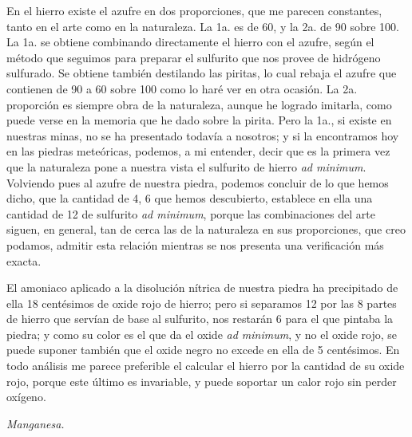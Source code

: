 \documentclass[a4paper, 11pt, oneside, polutonikogreek, spanish]{article}
\begin{document}
En el hierro existe el azufre en dos proporciones, que me parecen constantes, tanto en el arte como en la naturaleza. La 1a. es de 60, y la 2a. de 90 sobre 100. La 1a. se obtiene combinando directamente el hierro con el azufre, según el método que seguimos para preparar el sulfurito que nos provee de hidrógeno sulfurado. Se obtiene también destilando las piritas, lo cual rebaja el azufre que contienen de 90 a 60 sobre 100 como lo haré ver en otra ocasión. La 2a. proporción es siempre obra de la naturaleza, aunque he logrado imitarla, como puede verse en la memoria que he dado sobre la pirita. Pero la 1a., si existe en nuestras minas, no se ha presentado todavía a nosotros; y si la encontramos hoy en las piedras meteóricas, podemos, a mi entender, decir que es la primera vez que la naturaleza pone a nuestra vista el sulfurito de hierro \emph{ad minimum}. Volviendo pues al azufre de nuestra piedra, podemos concluir de lo que hemos dicho, que la cantidad de 4, 6 que hemos descubierto, establece en ella una cantidad de 12 de sulfurito \emph{ad minimum}, porque las combinaciones del arte siguen, en general, tan de cerca las de la naturaleza en sus proporciones, que creo podamos, admitir esta relación mientras se nos presenta una verificación más exacta.

El amoniaco aplicado a la disolución nítrica de nuestra piedra ha precipitado de ella 18 centésimos de oxide rojo de hierro; pero si separamos 12 por las 8 partes de hierro que servían de base al sulfurito, nos restarán 6 para el que pintaba la piedra; y como su color es el que da el oxide \emph{ad minimum}, y no el oxide rojo, se puede suponer también que el oxide negro no excede en ella de 5 centésimos. En todo análisis me parece preferible el calcular el hierro por la cantidad de su oxide rojo, porque este último es invariable, y puede soportar un calor rojo sin perder oxígeno.
\clearpage
\begin{center}
\emph{Manganesa.}
\end{center}
\end{document}
